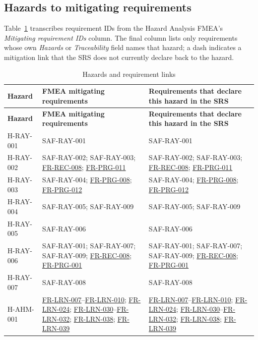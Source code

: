 \documentclass[12pt]{article}
\renewcommand{\_}{\textunderscore\allowbreak}%
\newcommand{\reqref}[1]{\hyperref[req:#1]{#1}}
\begin{document}
\subsection{Hazards to mitigating requirements}
\label{sec:hazard-req}

Table~\ref{tab:hazard-req} transcribes requirement IDs from the Hazard Analysis
FMEA's \emph{Mitigating requirement IDs} column. The final column lists only
requirements whose own \emph{Hazards} or \emph{Traceability} field names that
hazard; a dash indicates a mitigation link that the SRS does not currently
declare back to the hazard.

{\small
\begin{longtable}{@{}>{\raggedright\arraybackslash}p{}
>{\raggedright\arraybackslash}p{}
>{\raggedright\arraybackslash}p{}@{}}
\caption{Hazards and requirement links}
\label{tab:hazard-req}\\
\toprule
\textbf{Hazard} & \textbf{FMEA mitigating requirements} & \textbf{Requirements
that declare this hazard in the SRS} \\
\midrule
\endfirsthead
\toprule
\textbf{Hazard} & \textbf{FMEA mitigating requirements} & \textbf{Requirements
that declare this hazard in the SRS} \\
\midrule
\endhead
\bottomrule
\endlastfoot
H-RAY-001 & SAF-RAY-001 & SAF-RAY-001 \\
\addlinespace
H-RAY-002 & SAF-RAY-002; SAF-RAY-003; \reqref{FR-REC-008}; \reqref{FR-PRG-011} &
SAF-RAY-002; SAF-RAY-003; \reqref{FR-REC-008}; \reqref{FR-PRG-011} \\
\addlinespace
H-RAY-003 & SAF-RAY-004; \reqref{FR-PRG-008}; \reqref{FR-PRG-012} & SAF-RAY-004;
\reqref{FR-PRG-008}; \reqref{FR-PRG-012} \\
\addlinespace
H-RAY-004 & SAF-RAY-005; SAF-RAY-009 & SAF-RAY-005; SAF-RAY-009 \\
\addlinespace
H-RAY-005 & SAF-RAY-006 & SAF-RAY-006 \\
\addlinespace
H-RAY-006 & SAF-RAY-001; SAF-RAY-007; SAF-RAY-009; \reqref{FR-REC-008};
\reqref{FR-PRG-001} & SAF-RAY-001; SAF-RAY-007; SAF-RAY-009;
\reqref{FR-REC-008}; \reqref{FR-PRG-001} \\
\addlinespace
H-RAY-007 & SAF-RAY-008 & SAF-RAY-008 \\
\addlinespace
H-AHM-001 & \reqref{FR-LRN-007}--\reqref{FR-LRN-010}; \reqref{FR-LRN-024}; \reqref{FR-LRN-030}--\reqref{FR-LRN-032}; \reqref{FR-LRN-038}; \reqref{FR-LRN-039} &
\reqref{FR-LRN-007}--\reqref{FR-LRN-010}; \reqref{FR-LRN-024}; \reqref{FR-LRN-030}--\reqref{FR-LRN-032}; \reqref{FR-LRN-038}; \reqref{FR-LRN-039} \\

\end{longtable}}
\end{document}

